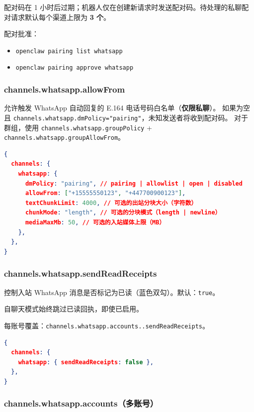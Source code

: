 配对码在 1 小时后过期；机器人仅在创建新请求时发送配对码。待处理的私聊配对请求默认每个渠道上限为 \textbf{3 个}。

配对批准：

\begin{itemize}
  \item \texttt{openclaw pairing list whatsapp}
  \item \texttt{openclaw pairing approve whatsapp }
\end{itemize}


\subsubsection{channels.whatsapp.allowFrom}


允许触发 WhatsApp 自动回复的 E.164 电话号码白名单（\textbf{仅限私聊}）。
如果为空且 \texttt{channels.whatsapp.dmPolicy="pairing"}，未知发送者将收到配对码。
对于群组，使用 \texttt{channels.whatsapp.groupPolicy} + \texttt{channels.whatsapp.groupAllowFrom}。

\begin{lstlisting}[language=json]
{
  channels: {
    whatsapp: {
      dmPolicy: "pairing", // pairing | allowlist | open | disabled
      allowFrom: ["+15555550123", "+447700900123"],
      textChunkLimit: 4000, // 可选的出站分块大小（字符数）
      chunkMode: "length", // 可选的分块模式（length | newline）
      mediaMaxMb: 50, // 可选的入站媒体上限（MB）
    },
  },
}
\end{lstlisting}


\subsubsection{channels.whatsapp.sendReadReceipts}


控制入站 WhatsApp 消息是否标记为已读（蓝色双勾）。默认：\texttt{true}。

自聊天模式始终跳过已读回执，即使已启用。

每账号覆盖：\texttt{channels.whatsapp.accounts..sendReadReceipts}。

\begin{lstlisting}[language=json]
{
  channels: {
    whatsapp: { sendReadReceipts: false },
  },
}
\end{lstlisting}


\subsubsection{channels.whatsapp.accounts（多账号）}


